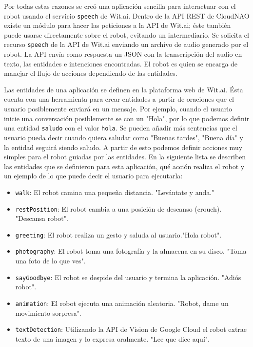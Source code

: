 Por todas estas razones se creó una aplicación sencilla
para interactuar con el robot usando el servicio \texttt{speech} de
Wit.ai.
Dentro de la API REST de CloudNAO existe un módulo para hacer las peticiones
a la API de Wit.ai; éste también puede usarse directamente sobre
el robot, evitando un intermediario.
Se solicita el recurso \texttt{speech} de la API de Wit.ai 
enviando
un archivo de audio generado por el robot. La API
envía como respuesta un JSON con la transcripción del audio 
en texto, las entidades e intenciones encontradas.
El robot es quien se encarga de manejar el flujo de
acciones dependiendo de las entidades.

Las entidades de una aplicación se definen en la plataforma
web de Wit.ai. Ésta cuenta con una herramienta para
crear entidades a partir de oraciones que el usuario
posiblemente enviará en un mensaje. Por ejemplo,
cuando el usuario inicie una conversación posiblemente
se con un "Hola", por lo que podemos definir una
entidad \texttt{saludo} con el valor \texttt{hola}.
Se pueden añadir más sentencias que el usuario
pueda decir cuando quiera saludar como "Buenas tardes",
"Buena día" y la entidad seguirá siendo saludo.
A partir de esto podemos definir acciones muy simples
para el robot guiadas por las entidades. En la
siguiente lista se describen las entidades que se
definieron para esta aplicación, qué acción realiza el robot
y un ejemplo de lo que puede decir el usuario para ejecutarla:


\begin{itemize}
\item  \texttt{walk}: El robot camina una pequeña distancia. "Levántate y anda."
\item \texttt{restPosition}: El robot cambia a una posición de descanso (crouch). "Descansa robot".
\item \texttt{greeting}: El robot realiza un gesto y saluda al usuario."Hola robot".
\item \texttt{photography}: El robot toma una fotografía y la almacena en su disco. "Toma una foto de lo que ves".
\item \texttt{sayGoodbye}: El robot se despide del usuario y termina la aplicación. "Adiós robot".
\item \texttt{animation}: El robot ejecuta una animación aleatoria.
"Robot, dame un movimiento sorpresa".
\item \texttt{textDetection}: Utilizando la API de Vision de Google Cloud
el robot extrae texto de una imagen y lo expresa oralmente. "Lee que dice
aquí".
\end{itemize}

